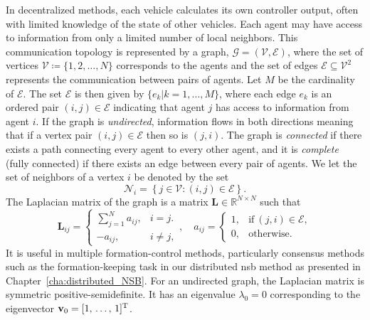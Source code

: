 In decentralized methods, each vehicle calculates its own controller output, often with limited knowledge of the state of other vehicles. Each agent may have access to information from only a limited number of local neighbors. This communication topology is represented by a graph, $\mathcal{G} = (\mathcal{V}, \mathcal{E})$, where the set of vertices $\mathcal{V} \coloneqq \{1,2,\ldots,N\}$ corresponds to the agents and the set of edges $\mathcal{E} \subseteq \mathcal{V}^2$ represents the communication between pairs of agents. Let $M$ be the cardinality of $\mathcal{E}$. The set $\mathcal{E}$ is then given by $\{e_k | k = 1, \ldots , M\}$, where each edge $e_k$ is an ordered pair $(i,j) \in \mathcal{E}$ indicating that agent $j$ has access to information from agent $i$. If the graph is \textit{undirected}, information flows in both directions meaning that if a vertex pair $(i,j)\in \mathcal{E}$ then so is $(j,i)$. The graph is \textit{connected} if there exists a path connecting every agent to every other agent, and it is \textit{complete} (fully connected) if there exists an edge between every pair of agents. We let the set of neighbors of a vertex $i$ be denoted by the set
\begin{equation}
    \mathcal{N}_i = \left\{ j \in \mathcal{V} \colon (i,j) \in \mathcal{E}\right\}.
\end{equation}
The Laplacian matrix of the graph is a matrix $\mathbf{L}\in \mathbb{R}^{N\times N}$ such that
\begin{equation}\label{eq:laplacian_matrix}
\mathbf{L}_{ij}=\begin{cases}\sum\limits_{j=1}^{N}a_{ij}, & i=j.\\ -a_{ij}, & i\neq j,\end{cases}, \quad  a_{ij}=\begin{cases} 1, & \mathrm{i}\mathrm{f} \ (j, i)\in \mathcal{E},\\ 0, & \text{otherwise}.\end{cases}
\end{equation}
It is useful in multiple formation-control methods, particularly consensus methods such as the formation-keeping task in our distributed \gls{nsb} method as presented in Chapter~\ref{cha:distributed_NSB}. For an undirected graph, the Laplacian matrix is symmetric positive-semidefinite. It has an eigenvalue $\lambda_0 = 0$ corresponding to the eigenvector $\mathbf{v}_0 = [1,\, \ldots ,\, 1]^{\rm T}$.\enlargethispage*{\baselineskip}


